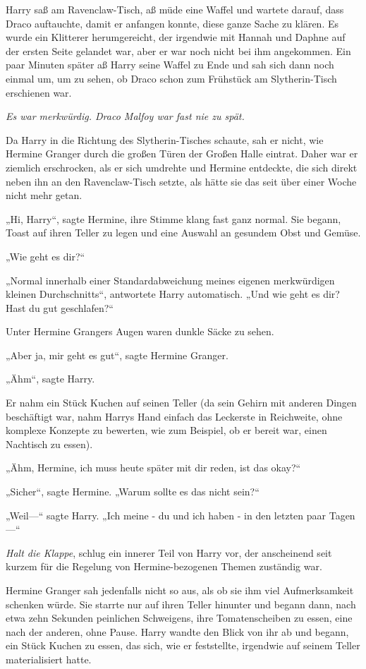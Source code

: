 {Harry saß am Ravenclaw-Tisch, aß müde eine Waffel und wartete darauf, dass Draco auftauchte, damit er anfangen konnte, diese ganze Sache zu klären. Es wurde ein Klitterer herumgereicht, der irgendwie mit Hannah und Daphne auf der ersten Seite gelandet war, aber er war noch nicht bei ihm angekommen. Ein paar Minuten später aß Harry seine Waffel zu Ende und sah sich dann noch einmal um, um zu sehen, ob Draco schon zum Frühstück am Slytherin-Tisch erschienen war.

\emph{Es war merkwürdig. Draco Malfoy war fast nie zu spät.}

Da Harry in die Richtung des Slytherin-Tisches schaute, sah er nicht, wie Hermine Granger durch die großen Türen der Großen Halle eintrat. Daher war er ziemlich erschrocken, als er sich umdrehte und Hermine entdeckte, die sich direkt neben ihn an den Ravenclaw-Tisch setzte, als hätte sie das seit über einer Woche nicht mehr getan.

„Hi, Harry“, sagte Hermine, ihre Stimme klang fast ganz normal. Sie begann, Toast auf ihren Teller zu legen und eine Auswahl an gesundem Obst und Gemüse.

„Wie geht es dir?“

„Normal innerhalb einer Standardabweichung meines eigenen merkwürdigen kleinen Durchschnitts“, antwortete Harry automatisch. „Und wie geht es dir? Hast du gut geschlafen?“

Unter Hermine Grangers Augen waren dunkle Säcke zu sehen.

„Aber ja, mir geht es gut“, sagte Hermine Granger.

„Ähm“, sagte Harry.

Er nahm ein Stück Kuchen auf seinen Teller (da sein Gehirn mit anderen Dingen beschäftigt war, nahm Harrys Hand einfach das Leckerste in Reichweite, ohne komplexe Konzepte zu bewerten, wie zum Beispiel, ob er bereit war, einen Nachtisch zu essen).

„Ähm, Hermine, ich muss heute später mit dir reden, ist das okay?“

„Sicher“, sagte Hermine. „Warum sollte es das nicht sein?“

„Weil—“ sagte Harry. „Ich meine - du und ich haben - in den letzten paar Tagen—“

\emph{Halt die Klappe}, schlug ein innerer Teil von Harry vor, der anscheinend seit kurzem für die Regelung von Hermine-bezogenen Themen zuständig war.

Hermine Granger sah jedenfalls nicht so aus, als ob sie ihm viel Aufmerksamkeit schenken würde. Sie starrte nur auf ihren Teller hinunter und begann dann, nach etwa zehn Sekunden peinlichen Schweigens, ihre Tomatenscheiben zu essen, eine nach der anderen, ohne Pause. Harry wandte den Blick von ihr ab und begann, ein Stück Kuchen zu essen, das sich, wie er feststellte, irgendwie auf seinem Teller materialisiert hatte.

}
